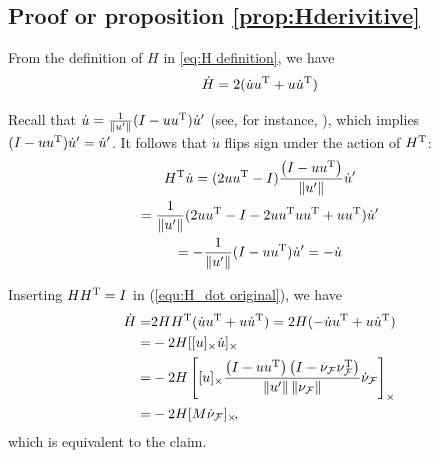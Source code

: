 \documentclass[10pt,twocolumn,twoside]{IEEEtran}
\begin{document}
\subsection{Proof or proposition \ref{prop:Hderivitive}} \label{proof:Hderivitive}
    From the definition of $H$ in \eqref{eq:H definition}, we have
    \begin{equation} \label{equ:H_dot original}
      \dot H =   2(\dot u u^\mathrm{T} + u \dot u^\mathrm{T})
    \end{equation}

    Recall that $\dot{u}=\frac{1}{\lVert u'\rVert}(I-uu^\mathrm{T})\dot{u}'$ (see, for instance, \cite{Tron:Arxiv14}), which implies $(I-uu^\mathrm{T})\dot{u}'=\dot{u}'$. It follows that $\dot{u}$ flips sign under the action of $H^\mathrm{T}$:
    \begin{multline}
      H^\mathrm{T} \dot u = (2u u^\mathrm{T}-I)\frac{ \left( I - u u^\mathrm{T} \right) } {\left\|u'\right\|} \dot u' \\
      =\frac{1}{\lVert u'\rVert} (2u u^\mathrm{T}-I-2u u^\mathrm{T} u u^\mathrm{T}+u u^\mathrm{T})\dot{u}'\\
      = -\frac{1}{\lVert u'\rVert} (I-u u^\mathrm{T})\dot u'
      = -\dot u
    \end{multline}

    Inserting $HH^\mathrm{T}=I$ in (\ref{equ:H_dot original}), we have
    \begin{equation}
      \begin{split}
        \dot H =  &  2H H^\mathrm{T}(\dot u u^\mathrm{T} + u \dot u^\mathrm{T})
        =  2 H (-\dot u u^\mathrm{T} + u \dot u^\mathrm{T})\\
        =  &  -2H [[u]_{\times} \dot u]_{\times} \\
        = &  -2 H \left[ [u]_{\times}  \frac{ \left( I - u u^\mathrm{T} \right) \left( I- \nu_{\mathcal{F}} \nu_{\mathcal{F}}^\mathrm{T} \right)} {\left\|u'\right\| \left\|\nu_{\mathcal{F}}\right\|} \dot{\nu}_{\mathcal{F}}\right]_{\times}\\
        = & -2 H [M \dot{\nu}_{\mathcal{F}}]_{\times}\!,
      \end{split}
    \end{equation}
    which is equivalent to the claim.
  
\end{document}
